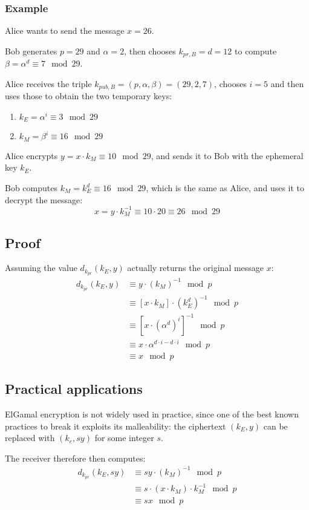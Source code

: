 \subsubsection{Example}
Alice wants to send the message $x = 26$.

Bob generates $p = 29$ and $\alpha = 2$, then chooses $k_{pr, B} = d = 12$ to compute $\beta = \alpha^d \equiv 7 \mod 29$.

Alice receives the triple $k_{pub, B} = (p, \alpha, \beta) = (29, 2, 7)$, chooses $i = 5$ and then uses those to obtain the two temporary keys:
\begin{enumerate}
	\item $k_E = \alpha^i \equiv 3 \mod 29$
	\item $k_M = \beta^i \equiv 16 \mod 29$
\end{enumerate}
Alice encrypts $y = x \cdot k_M \equiv 10 \mod 29$, and sends it to Bob with the ephemeral key $k_E$.

Bob computes $k_M = k_E^d \equiv 16 \mod 29$, which is the same as Alice, and uses it to decrypt the message:
$$x = y \cdot k^{-1}_M \equiv 10 \cdot 20 \equiv 26 \mod 29$$

\subsection{Proof}
Assuming the value $d_{k_{pr}}(k_E, y)$ actually returns the original message $x$:
\begin{equation}
\begin{split}
d_{k_{pr}}(k_E, y) &\equiv y \cdot (k_M)^{-1} \mod p \\
&\equiv [x \cdot k_M] \cdot (k_E^d)^{-1} \mod p \\
&\equiv [x \cdot (\alpha^d)^i]^{-1} \mod p \\
&\equiv x \cdot \alpha^{d \cdot i - d \cdot i} \mod p \\
&\equiv x \mod p
\end{split}
\end{equation}

\subsection{Practical applications}
ElGamal encryption is not widely used in practice, since one of the best known practices to break it exploits its malleability: the ciphertext $(k_E, y)$ can be replaced with $(k_e, sy)$ for some integer $s$.

The receiver therefore then computes:
\begin{equation}
\begin{split}
d_{k_{pr}}(k_E, sy) &\equiv sy \cdot (k_M)^{-1} \mod p \\
&\equiv s \cdot (x \cdot k_M) \cdot k_M^{-1} \mod p \\
&\equiv sx \mod p
\end{split}
\end{equation}

